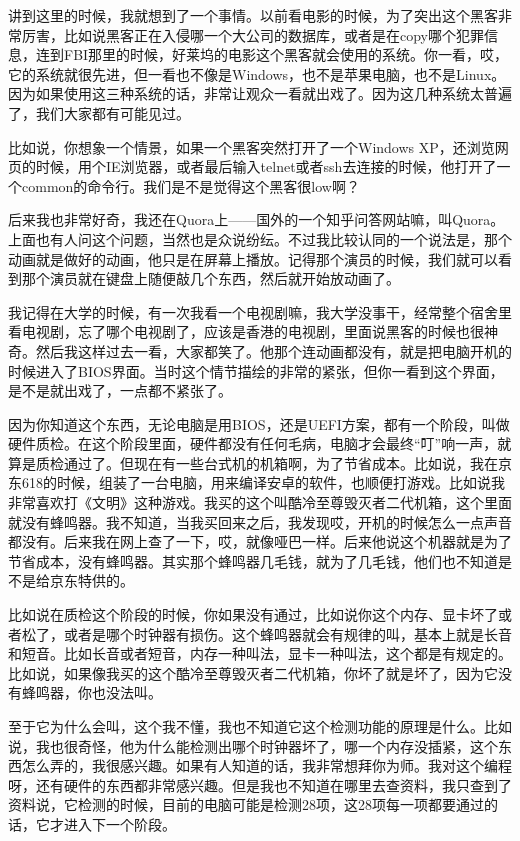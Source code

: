 \documentclass[
  letterpaper,
  DIV=11,
  numbers=noendperiod]{scrreprt}
\begin{document}
讲到这里的时候，我就想到了一个事情。以前看电影的时候，为了突出这个黑客非常厉害，比如说黑客正在入侵哪一个大公司的数据库，或者是在copy哪个犯罪信息，连到FBI那里的时候，好莱坞的电影这个黑客就会使用的系统。你一看，哎，它的系统就很先进，但一看也不像是Windows，也不是苹果电脑，也不是Linux。因为如果使用这三种系统的话，非常让观众一看就出戏了。因为这几种系统太普遍了，我们大家都有可能见过。

比如说，你想象一个情景，如果一个黑客突然打开了一个Windows
XP，还浏览网页的时候，用个IE浏览器，或者最后输入telnet或者ssh去连接的时候，他打开了一个common的命令行。我们是不是觉得这个黑客很low啊？

后来我也非常好奇，我还在Quora上------国外的一个知乎问答网站嘛，叫Quora。上面也有人问这个问题，当然也是众说纷纭。不过我比较认同的一个说法是，那个动画就是做好的动画，他只是在屏幕上播放。记得那个演员的时候，我们就可以看到那个演员就在键盘上随便敲几个东西，然后就开始放动画了。

我记得在大学的时候，有一次我看一个电视剧嘛，我大学没事干，经常整个宿舍里看电视剧，忘了哪个电视剧了，应该是香港的电视剧，里面说黑客的时候也很神奇。然后我这样过去一看，大家都笑了。他那个连动画都没有，就是把电脑开机的时候进入了BIOS界面。当时这个情节描绘的非常的紧张，但你一看到这个界面，是不是就出戏了，一点都不紧张了。

因为你知道这个东西，无论电脑是用BIOS，还是UEFI方案，都有一个阶段，叫做硬件质检。在这个阶段里面，硬件都没有任何毛病，电脑才会最终``叮''响一声，就算是质检通过了。但现在有一些台式机的机箱啊，为了节省成本。比如说，我在京东618的时候，组装了一台电脑，用来编译安卓的软件，也顺便打游戏。比如说我非常喜欢打《文明》这种游戏。我买的这个叫酷冷至尊毁灭者二代机箱，这个里面就没有蜂鸣器。我不知道，当我买回来之后，我发现哎，开机的时候怎么一点声音都没有。后来我在网上查了一下，哎，就像哑巴一样。后来他说这个机器就是为了节省成本，没有蜂鸣器。其实那个蜂鸣器几毛钱，就为了几毛钱，他们也不知道是不是给京东特供的。

比如说在质检这个阶段的时候，你如果没有通过，比如说你这个内存、显卡坏了或者松了，或者是哪个时钟器有损伤。这个蜂鸣器就会有规律的叫，基本上就是长音和短音。比如长音或者短音，内存一种叫法，显卡一种叫法，这个都是有规定的。比如说，如果像我买的这个酷冷至尊毁灭者二代机箱，你坏了就是坏了，因为它没有蜂鸣器，你也没法叫。

至于它为什么会叫，这个我不懂，我也不知道它这个检测功能的原理是什么。比如说，我也很奇怪，他为什么能检测出哪个时钟器坏了，哪一个内存没插紧，这个东西怎么弄的，我很感兴趣。如果有人知道的话，我非常想拜你为师。我对这个编程呀，还有硬件的东西都非常感兴趣。但是我也不知道在哪里去查资料，我只查到了资料说，它检测的时候，目前的电脑可能是检测28项，这28项每一项都要通过的话，它才进入下一个阶段。
\end{document}
